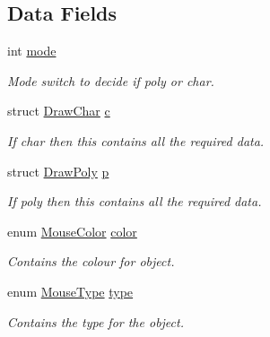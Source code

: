 \subsection*{Data Fields}
\begin{DoxyCompactItemize}
\item 
int \hyperlink{structDrawCmd_a5cf8d6495b68a470cd6ce309c3940776}{mode}\hypertarget{structDrawCmd_a5cf8d6495b68a470cd6ce309c3940776}{}\label{structDrawCmd_a5cf8d6495b68a470cd6ce309c3940776}

\begin{DoxyCompactList}\small\item\em Mode switch to decide if poly or char. \end{DoxyCompactList}\item 
struct \hyperlink{structDrawChar}{Draw\+Char} \hyperlink{structDrawCmd_aaf01f346c2f60c6b269793bfc7d2b636}{c}\hypertarget{structDrawCmd_aaf01f346c2f60c6b269793bfc7d2b636}{}\label{structDrawCmd_aaf01f346c2f60c6b269793bfc7d2b636}

\begin{DoxyCompactList}\small\item\em If char then this contains all the required data. \end{DoxyCompactList}\item 
struct \hyperlink{structDrawPoly}{Draw\+Poly} \hyperlink{structDrawCmd_a0c6659b08b04117b81702addfa7ff9b3}{p}\hypertarget{structDrawCmd_a0c6659b08b04117b81702addfa7ff9b3}{}\label{structDrawCmd_a0c6659b08b04117b81702addfa7ff9b3}

\begin{DoxyCompactList}\small\item\em If poly then this contains all the required data. \end{DoxyCompactList}\item 
enum \hyperlink{s4396122__os__draw_8h_a5fbae3ca85fb9acf7a146955bc6b69c4}{Mouse\+Color} \hyperlink{structDrawCmd_ab07f8653fee749d7bf4d4a5ae10162a5}{color}\hypertarget{structDrawCmd_ab07f8653fee749d7bf4d4a5ae10162a5}{}\label{structDrawCmd_ab07f8653fee749d7bf4d4a5ae10162a5}

\begin{DoxyCompactList}\small\item\em Contains the colour for object. \end{DoxyCompactList}\item 
enum \hyperlink{s4396122__os__draw_8h_a1a15f1712ba14a6877038ffe9c6f7708}{Mouse\+Type} \hyperlink{structDrawCmd_a504719fb9ab8d366ee292d175f04abaf}{type}\hypertarget{structDrawCmd_a504719fb9ab8d366ee292d175f04abaf}{}\label{structDrawCmd_a504719fb9ab8d366ee292d175f04abaf}

\begin{DoxyCompactList}\small\item\em Contains the type for the object. \end{DoxyCompactList}\end{DoxyCompactItemize}


